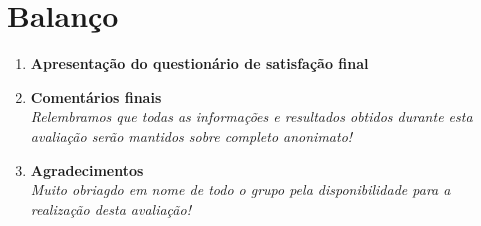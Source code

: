 \documentclass[12pt]{article}
\begin{document}
\section*{Balanço}
    \begin{enumerate}
        \item \textbf{Apresentação do questionário de satisfação final}
        
        \item \textbf{Comentários finais}\\
        \textit{Relembramos que todas as informações e resultados obtidos durante esta avaliação serão mantidos sobre completo anonimato!}
        
        \item \textbf{Agradecimentos}\\
        \textit{Muito obriagdo em nome de todo o grupo pela disponibilidade para a realização desta avaliação!}
    \end{enumerate}
\end{document}

